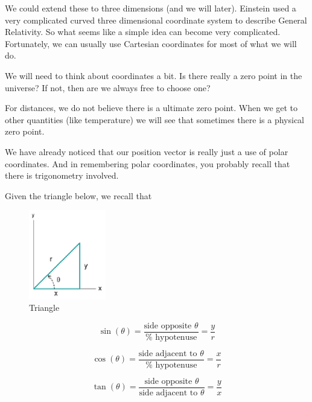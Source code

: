 \documentclass[]{Book}
\begin{document}
We could extend these to three dimensions (and we will later). Einstein used
a very complicated curved three dimensional coordinate system to describe
General Relativity. So what seems like a simple idea can become very
complicated. Fortunately, we can usually use Cartesian coordinates for most
of what we will do.

We will need to think about coordinates a bit. Is there really a zero point
in the universe? If not, then are we always free to choose one?

For distances, we do not believe there is a ultimate zero point. When we get
to other quantities (like temperature) we will see that sometimes there is a
physical zero point.


We have already noticed that our position vector is really just a use of
polar coordinates. And in remembering polar coordinates, you probably recall
that there is trigonometry involved.

Given the triangle below, we recall that 

\begin{figure}[h!]
	\begin{center}
		\includegraphics[width=0.3\textwidth]{Triangle}	
		\caption{Triangle}
		\label{fig:Triangle}
	\end{center}
\end{figure}

\begin{equation}
	\sin \left( \theta \right) =\frac{\text{side opposite }\theta }{\text{%
			hypotenuse}}=\frac{y}{r}
\end{equation}

\begin{equation}
	\cos \left( \theta \right) =\frac{\text{side adjacent to }\theta }{\text{%
			hypotenuse}}=\frac{x}{r}
\end{equation}

\begin{equation}
	\tan \left( \theta \right) =\frac{\text{side opposite }\theta }{\text{side
			adjacent to }\theta }=\frac{y}{x}
\end{equation}
\end{document}
